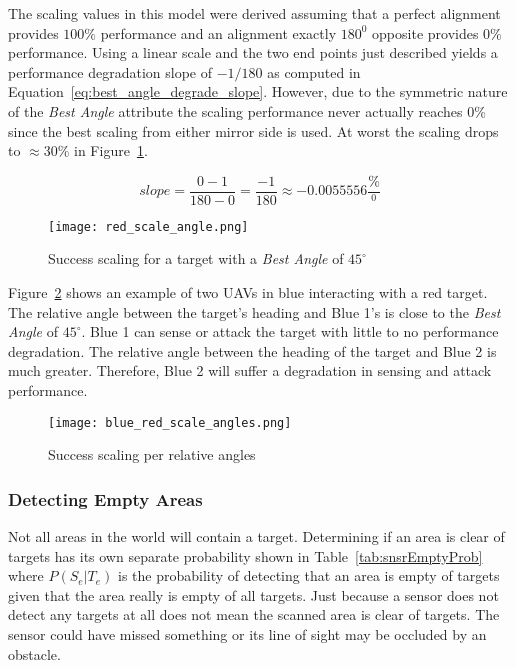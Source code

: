 The scaling values in this model were derived assuming that a perfect alignment provides $100\%$ performance and an alignment exactly $180^{0}$ opposite provides $0\%$ performance.  Using a linear scale and the two end points just described yields a performance degradation slope of $-1 / 180$ as computed in Equation~\ref{eq:best_angle_degrade_slope}. However, due to the symmetric nature of the \textit{Best Angle} attribute the scaling performance never actually reaches $0\%$ since the best scaling from either mirror side is used.  At worst the scaling drops to $\approx30\%$ in Figure~\ref{fig:targetAngles}. 

\begin{equation}
\label{eq:best_angle_degrade_slope}
slope = \frac{0 - 1}{180-0} = \frac{-1}{180} \approx -0.0055556\frac{\%}{^{0}}
\end{equation}


\begin{figure}[H]
	\centering
	\texttt{[image: red\_scale\_angle.png]}
	\caption{Success scaling for a target with a \textit{Best Angle} of $45^{\circ}$}
	\label{fig:targetAngles}
\end{figure}

Figure~\ref{fig:blue_red_angles} shows an example of two UAVs in blue interacting with a red target.  The relative angle between the target's heading and Blue 1's is close to the \textit{Best Angle} of $45^{\circ}$.  Blue 1 can sense or attack the target with little to no performance degradation.  The relative angle between the heading of the target and Blue 2 is much greater.  Therefore, Blue 2 will suffer a degradation in sensing and attack performance.

\begin{figure}[H]
	\centering
	\texttt{[image: blue\_red\_scale\_angles.png]}
	\caption{Success scaling per relative angles}
	\label{fig:blue_red_angles}
\end{figure}


\subsubsection{Detecting Empty Areas}
Not all areas in the world will contain a target.  Determining if an area is clear of targets has its own separate probability shown in Table~\ref{tab:snsrEmptyProb} where $P(S_{e}|T_{e})$ is the probability of detecting that an area is empty of targets given that the area really is empty of all targets.  Just because a sensor does not detect any targets at all does not mean the scanned area is clear of targets.  The sensor could have missed something or its line of sight may be occluded by an obstacle.

